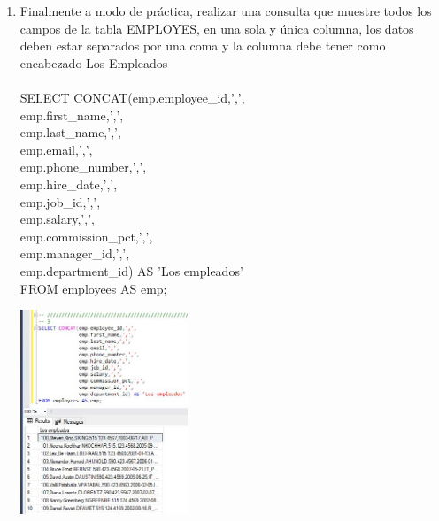 \begin{enumerate}[1.]
	\item  Finalmente a modo de práctica, realizar una consulta que muestre todos los campos de la tabla EMPLOYES, en una sola y única columna, los datos deben estar separados por una coma y la columna debe tener como encabezado Los Empleados
	\\
	\\SELECT CONCAT(emp.employee\_id,',', \\
			  emp.first\_name,',', \\
			  emp.last\_name,',', \\
			  emp.email,',', \\
			  emp.phone\_number,',', \\
			  emp.hire\_date,',', \\
			  emp.job\_id,',', \\
			  emp.salary,',', \\
			  emp.commission\_pct,',', \\
			  emp.manager\_id,',', \\
			  emp.department\_id) AS 'Los empleados' \\
	FROM employees AS emp; \\
	\begin{center}
	\includegraphics[width=5cm]{./Imagenes/actividad0303} 
	\end{center}

\end{enumerate}



